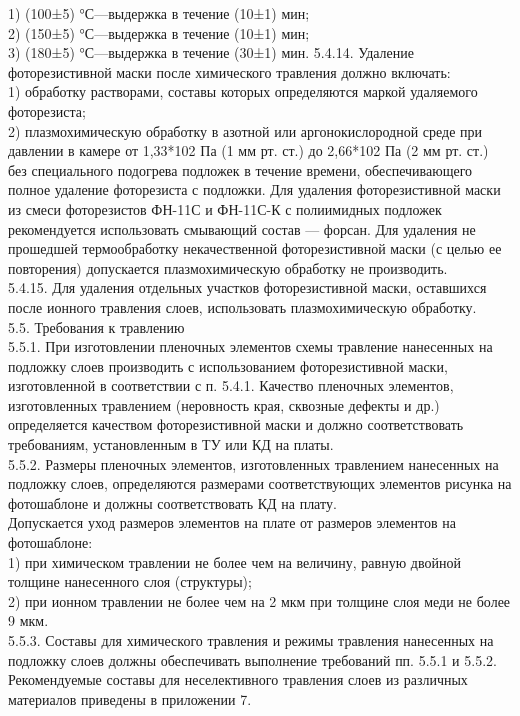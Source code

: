\documentclass{bmstu}
\begin{document}
	1) (100±5) °С—выдержка в течение (10±1) мин; \\
	2) (150±5) °С—выдержка в течение (10±1) мин; \\
	3) (180±5) °С—выдержка в течение (30±1) мин. 5.4.14. Удаление фоторезистивной маски после химического травления должно включать: \\
	1) обработку растворами, составы которых определяются маркой удаляемого фоторезиста; \\
	2) плазмохимическую обработку в азотной или аргонокислородной среде при давлении в камере от 1,33*102 Па (1 мм рт. ст.) до 2,66*102 Па (2 мм рт. ст.) без специального подогрева подложек в течение времени, обеспечивающего полное удаление фоторезиста с подложки. Для удаления фоторезистивной маски из смеси фоторезистов ФН-11С и ФН-11С-К  с полиимидных подложек рекомендуется использовать смывающий состав — форсан. Для удаления не прошедшей термообработку некачественной фоторезистивной маски (с целью ее повторения) допускается плазмохимическую обработку не производить. \\
	5.4.15. Для удаления отдельных участков фоторезистивной маски, оставшихся после ионного травления слоев, использовать плазмохимическую обработку. \\
	5.5. Требования к травлению \\
	5.5.1. При изготовлении пленочных элементов схемы травление нанесенных на подложку слоев производить с использованием фоторезистивной маски, изготовленной в соответствии с п. 5.4.1. Качество пленочных элементов, изготовленных травлением (неровность края, сквозные дефекты и др.) определяется качеством фоторезистивной маски и должно соответствовать требованиям, установленным в ТУ или КД на платы. \\
	5.5.2. Размеры пленочных элементов, изготовленных травлением нанесенных на подложку слоев, определяются размерами соответствующих элементов рисунка на фотошаблоне и должны соответствовать КД на плату. \\
	Допускается уход размеров элементов на плате от размеров элементов на фотошаблоне: \\
	1) при химическом травлении не более чем на величину, равную двойной толщине нанесенного слоя (структуры); \\
	2) при ионном травлении не более чем на 2 мкм при толщине слоя меди не более 9 мкм. \\
	5.5.3. Составы для химического травления и режимы травления нанесенных на подложку слоев должны обеспечивать выполнение требований пп. 5.5.1 и 5.5.2. Рекомендуемые составы для неселективного травления слоев из различных материалов приведены в приложении 7. \\
\end{document}
